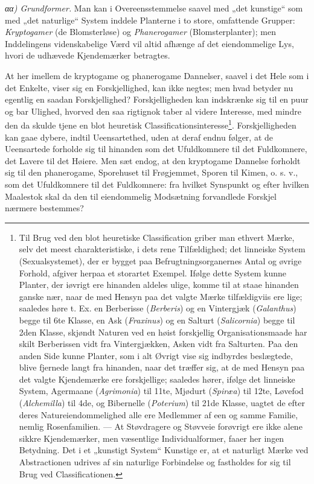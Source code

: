 \documentclass[12pt,a4paper]{book}
\begin{document}
\emph{αα) Grundformer.} Man kan i Overeensstemmelse saavel med „det
kunstige“ som med „det naturlige“ System inddele Planterne i to store,
omfattende Grupper: \emph{Kryptogamer} (de Blomsterløse) og
\emph{Phanerogamer} (Blomsterplanter); men Inddelingens videnskabelige
Værd vil altid afhænge af det eiendommelige Lys, hvori de udhævede
Kjendemærker betragtes.

At her imellem de kryptogame og phanerogame Dannelser, saavel i det Hele
som i det Enkelte, viser sig en Forskjellighed, kan ikke negtes; men
hvad betyder nu egentlig en saadan Forskjellighed? Forskjelligheden kan
indskrænke sig til en puur og bar Ulighed, hvorved den saa rigtignok
taber al videre Interesse, med mindre den da skulde tjene en blot
heuretisk Classificationsinteresse\footnote{Til Brug ved den blot
heuretiske Classification griber man ethvert Mærke, selv det meest
charakteristiske, i dets rene Tilfældighed; det linneiske System
(Sexualsystemet), der er bygget paa Befrugtningsorganernes Antal og
øvrige Forhold, afgiver herpaa et storartet Exempel. Ifølge dette System
kunne Planter, der iøvrigt ere hinanden aldeles ulige, komme til at
staae hinanden ganske nær, naar de med Hensyn paa det valgte Mærke
tilfældigviis ere lige; saaledes høre t. Ex. en Berberisse
(\textit{Berberis}) og en Vintergjæk (\textit{Galanthus}) begge til 6te
Klasse, en Ask (\textit{Fraxinus}) og en Salturt
(\textit{Salicornia}) begge til 2den Klasse, skjøndt Naturen ved en
høist forskjellig Organisationsmaade har skilt Berberissen vidt fra
Vintergjækken, Asken vidt fra Salturten. Paa den anden Side kunne
Planter, som i alt Øvrigt vise sig indbyrdes beslægtede, blive fjernede
langt fra hinanden, naar det træffer sig, at de med Hensyn paa det
valgte Kjendemærke ere forskjellige; saaledes hører, ifølge det
linneiske System, Agermaane (\textit{Agrimonia}) til 11te, Mjødurt
(\textit{Spiræa}) til 12te, Løvefod (\textit{Alchemilla}) til 4de, og
Bibernelle (\textit{Poterium}) til 21de Klasse, uagtet de efter deres
Natureiendommelighed alle ere Medlemmer af een og samme Familie, nemlig
Rosenfamilien. --- At Støvdragere og Støvveie forøvrigt ere ikke alene
sikkre Kjendemærker, men væsentlige Individualformer, faaer her ingen
Betydning. Det i et „kunstigt System“ Kunstige er, at et naturligt Mærke
ved Abstractionen udrives af sin naturlige Forbindelse og fastholdes for
sig til Brug ved Classificationen.}. Forskjelligheden kan gaae dybere,
indtil
Ueensartethed, uden at deraf endnu følger, at de Ueensartede forholde
sig til hinanden som det Ufuldkomnere til det Fuldkomnere, det Lavere
til det Høiere. Men sæt endog, at den kryptogame Dannelse forholdt sig
til den phanerogame, Sporehuset til Frøgjemmet, Sporen til Kimen, o. s.
v., som det Ufuldkomnere til det Fuldkomnere: fra hvilket Synspunkt og
efter hvilken Maalestok skal da den til eiendommelig Modsætning
forvandlede Forskjel nærmere bestemmes?
\end{document}
